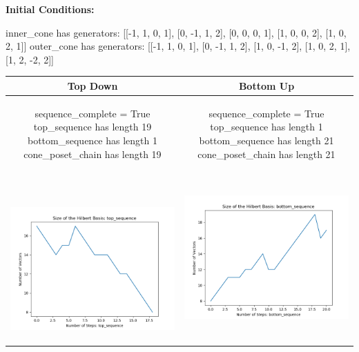 \documentclass[10pt]{article}
\begin{document}
\textbf{Initial Conditions:}
\begin{SAGE}
inner_cone has generators: 
[[-1, 1, 0, 1], [0, -1, 1, 2], [0, 0, 0, 1], [1, 0, 0, 2], [1, 0, 2, 1]]
outer_cone has generators: 
[[-1, 1, 0, 1], [0, -1, 1, 2], [1, 0, -1, 2], [1, 0, 2, 1], [1, 2, -2, 2]]

\end{SAGE}
\begin{tabular}{c|c}
\textbf{Top Down} & \textbf{Bottom Up} \\ \hline  
\begin{SAGE}
	sequence_complete = True
	top_sequence has length 19
	bottom_sequence has length 1
	cone_poset_chain has length 19
\end{SAGE} 
&
\begin{SAGE}
	sequence_complete = True
	top_sequence has length 1
	bottom_sequence has length 21
	cone_poset_chain has length 21
\end{SAGE} 
\\ \hline
\
\begin{minipage}{.45\textwidth}
\includegraphics[width=\textwidth]{"DATA/4d/5 generators 2 bound A/top_sequence SIZE"}
\end{minipage} &
\begin{minipage}{.45\textwidth}
\includegraphics[width=\textwidth]{"DATA/4d/5 generators 2 bound A bottomup/bottom_sequence SIZE"}

\end{minipage}
\end{tabular}
\end{document}
